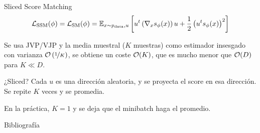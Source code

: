 \documentclass{beamer}
\begin{document}
\begin{frame}{Sliced Score Matching}
    \begin{equation*}
        \mathcal{L}_\text{SSM}(\phi) = \mathcal{L}_\text{SM}(\phi) = \mathbb{E}_{x\sim p_\text{data}, u}\left[u^t\left(\nabla_x s_\phi(x)\right) u + \frac{1}{2}\left(u^ts_\phi(x)\right)^2\right]
    \end{equation*}

    \pause
    Se usa JVP/VJP y la media muestral ($K$ muestras) como estimador insesgado con varianza $\mathcal{O}\left(\nicefrac{1}{K}\right)$, se obtiene un coste $\mathcal{O}(K)$, que es mucho menor que $\mathcal{O}(D)$ para $K\ll D$.\pause\vspace{0.5cm}
    
    {\color{red} ¿Sliced?} Cada $u$ es una dirección aleatoria, y se proyecta el score en esa dirección. Se repite $K$ veces y se promedia.\pause\vspace{0.5cm}

    En la práctica, $K=1$ y se deja que el minibatch haga el promedio.
\end{frame}







\begin{frame}[allowframebreaks]{Bibliografía}
    \nocite{lai2026principlesdiffusionmodels}
    \printbibliography
\end{frame}
\end{document}
